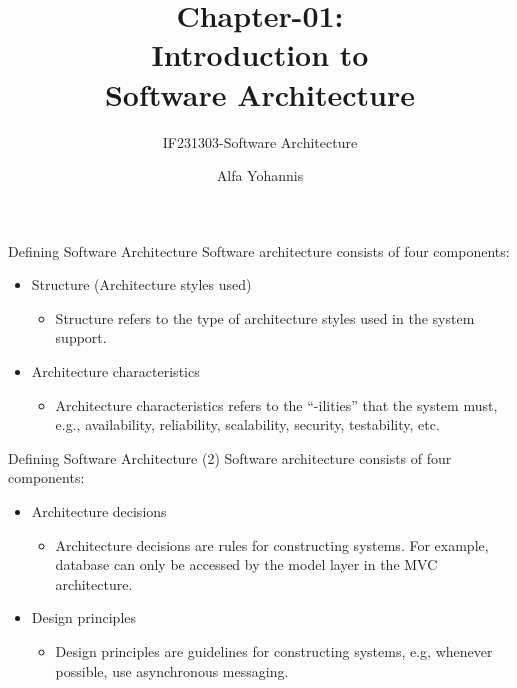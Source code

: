 \documentclass[aspectratio=169, table]{beamer}
\title{Chapter-01:\\Introduction to\\Software Architecture}
\subtitle{IF231303-Software Architecture}
\author{Alfa Yohannis}
\begin{document}
	\begin{frame}[plain]
		\maketitle
	\end{frame}
	\begin{frame}{Defining Software Architecture}
	Software architecture consists of four components:
	\begin{itemize}

		\item Structure (Architecture styles used)
		\begin{itemize}
			\item Structure refers to the type of architecture styles used in the system support.
		\end{itemize}

		\item Architecture characteristics
		\begin{itemize}
			\item Architecture characteristics refers to the ``-ilities'' that the system must, e.g., availability, reliability, scalability, security, testability, etc.
		\end{itemize}


	\end{itemize}
\end{frame}

	\begin{frame}{Defining Software Architecture (2)}
		Software architecture consists of four components:
		\begin{itemize}


			\item Architecture decisions
			\begin{itemize}
				\item Architecture decisions are rules for constructing systems. For example, database can only be accessed by the model layer in the MVC architecture.
			\end{itemize}

			\item Design principles
			\begin{itemize}
				\item Design principles are guidelines for constructing systems, e.g, whenever possible, use asynchronous messaging.
			\end{itemize}

		\end{itemize}
	\end{frame}
\end{document}
